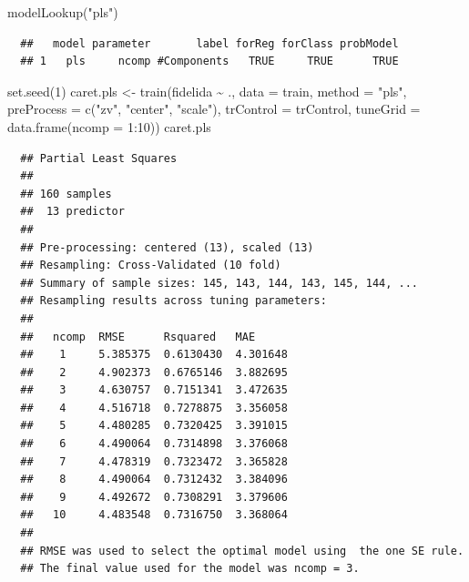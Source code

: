 \documentclass[
]{book}
\newenvironment{Shaded}{\begin{snugshade}}{\end{snugshade}}
\newcommand{\AttributeTok}[1]{\textcolor[rgb]{0.77,0.63,0.00}{#1}}
\newcommand{\DecValTok}[1]{\textcolor[rgb]{0.00,0.00,0.81}{#1}}
\newcommand{\FunctionTok}[1]{\textcolor[rgb]{0.00,0.00,0.00}{#1}}
\newcommand{\NormalTok}[1]{#1}
\newcommand{\OtherTok}[1]{\textcolor[rgb]{0.56,0.35,0.01}{#1}}
\newcommand{\SpecialCharTok}[1]{\textcolor[rgb]{0.00,0.00,0.00}{#1}}
\newcommand{\StringTok}[1]{\textcolor[rgb]{0.31,0.60,0.02}{#1}}
\theoremstyle{break}
\theoremstyle{nonumberplain}
\begin{document}
\begin{Shaded}
\begin{Highlighting}[]
\FunctionTok{modelLookup}\NormalTok{(}\StringTok{"pls"}\NormalTok{)}
\end{Highlighting}
\end{Shaded}

\begin{verbatim}
  ##   model parameter       label forReg forClass probModel
  ## 1   pls     ncomp #Components   TRUE     TRUE      TRUE
\end{verbatim}

\begin{Shaded}
\begin{Highlighting}[]
\FunctionTok{set.seed}\NormalTok{(}\DecValTok{1}\NormalTok{)}
\NormalTok{caret.pls }\OtherTok{\textless{}{-}} \FunctionTok{train}\NormalTok{(fidelida }\SpecialCharTok{\textasciitilde{}}\NormalTok{ ., }\AttributeTok{data =}\NormalTok{ train, }\AttributeTok{method =} \StringTok{"pls"}\NormalTok{,}
                   \AttributeTok{preProcess =} \FunctionTok{c}\NormalTok{(}\StringTok{"zv"}\NormalTok{, }\StringTok{"center"}\NormalTok{, }\StringTok{"scale"}\NormalTok{),}
                   \AttributeTok{trControl =}\NormalTok{ trControl, }\AttributeTok{tuneGrid =} \FunctionTok{data.frame}\NormalTok{(}\AttributeTok{ncomp =} \DecValTok{1}\SpecialCharTok{:}\DecValTok{10}\NormalTok{))}
\NormalTok{caret.pls}
\end{Highlighting}
\end{Shaded}

\begin{verbatim}
  ## Partial Least Squares 
  ## 
  ## 160 samples
  ##  13 predictor
  ## 
  ## Pre-processing: centered (13), scaled (13) 
  ## Resampling: Cross-Validated (10 fold) 
  ## Summary of sample sizes: 145, 143, 144, 143, 145, 144, ... 
  ## Resampling results across tuning parameters:
  ## 
  ##   ncomp  RMSE      Rsquared   MAE     
  ##    1     5.385375  0.6130430  4.301648
  ##    2     4.902373  0.6765146  3.882695
  ##    3     4.630757  0.7151341  3.472635
  ##    4     4.516718  0.7278875  3.356058
  ##    5     4.480285  0.7320425  3.391015
  ##    6     4.490064  0.7314898  3.376068
  ##    7     4.478319  0.7323472  3.365828
  ##    8     4.490064  0.7312432  3.384096
  ##    9     4.492672  0.7308291  3.379606
  ##   10     4.483548  0.7316750  3.368064
  ## 
  ## RMSE was used to select the optimal model using  the one SE rule.
  ## The final value used for the model was ncomp = 3.
\end{verbatim}
\end{document}
